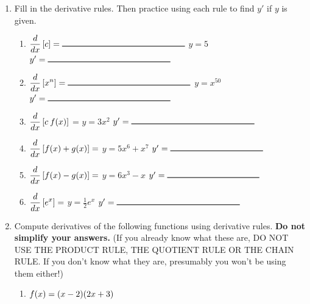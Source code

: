 \documentclass[11pt,fleqn]{article}
\begin{document}
\begin{enumerate}

\item Fill in the derivative rules. Then practice using each rule to find $y'$ if $y$ is given.\\
	\begin{enumerate}
	\item 
	$\d{\frac{d}{dx}\left[ c\right]} = \blank{2in}$ 
	  \hspace{1cm} $y = 5$ \hspace{1cm} $y' = \blank{2in}$
	\vfill
	\item $\d{\frac{d}{dx}\left[ x^n\right]} = \blank{2in}$ 
	  \hspace{1cm}
	 $y = x^{50}$ \hspace{1cm} $y' = \blank{2in}$
	\vfill
	\item $\displaystyle{\frac{d}{dx}\left[c \: f(x) \right]}$ = \blank{2in} 
	  \hspace{1cm}
  $y = 3x^{2}$ \hspace{1cm} $y' = \blank{2in}$
	\vfill
	
	\item $\displaystyle{\frac{d}{dx}\left[ f(x)+g(x)\right]}=$\blank{1.5in}
	  \hspace{1cm}
  $y = 5x^{6} + x^{7}$ \hspace{1cm} $y' = \blank{1.5in}$
	\vfill
	\item $\displaystyle{\frac{d}{dx}\left[ f(x)-g(x)\right]}=$ \blank{1.5in}
	  \hspace{1cm}
$y = 6x^{3} - x$ \hspace{1cm} $y' = \blank{1.5in}$
	\vfill
	\item $\displaystyle{\frac{d}{dx}\left[ e^x\right]}=$ \blank{2in}
	  \hspace{1cm} $y = \frac{1}{2} e^{x}$ \hspace{1cm} $y' = \blank{2in}$
	\vfill
	\end{enumerate}

\item Compute derivatives of the following functions using derivative rules. {\bf Do not simplify your answers.} (If you already know what these are, DO NOT USE THE PRODUCT RULE, THE QUOTIENT RULE OR THE CHAIN RULE. If you don't know what they are, presumably you won't be using them either!)\\
\begin{enumerate}
\item $\displaystyle{ f(x)=(x-2)(2x+3)}$
\vfill


\end{enumerate}
\end{enumerate}
\end{document}
